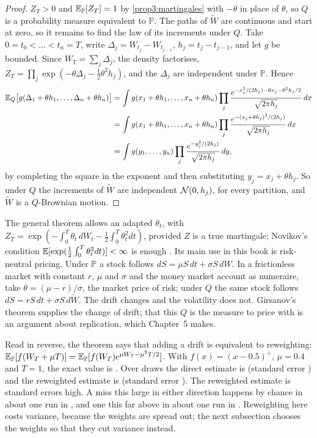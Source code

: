 \begin{chapterrefs}
\begin{proof}
$Z_T>0$ and $\mathbb{E}_{\mathbb P}[Z_T]=1$ by \cref{prop3:martingales} with $-\theta$ in place of $\theta$, so $Q$ is a
probability measure equivalent to $\mathbb P$. The paths of $\tilde W$ are continuous and start at zero, so it
remains to find the law of its increments under $Q$. Take $0=t_0<\dots<t_n=T$, write
$\Delta_j=W_{t_j}-W_{t_{j-1}}$, $h_j=t_j-t_{j-1}$, and let $g$ be bounded. Since $W_T=\sum_j\Delta_j$,
the density factorises, $Z_T=\prod_j\exp(-\theta\Delta_j-\tfrac12\theta^2h_j)$, and the $\Delta_j$ are
independent under $\mathbb P$. Hence
\begin{align*}
  \mathbb{E}_Q\bigl[g(\Delta_1+\theta h_1,\dots,\Delta_n+\theta h_n)\bigr]
  &= \int g(x_1+\theta h_1,\dots,x_n+\theta h_n)\prod_j\frac{e^{-x_j^2/(2h_j)-\theta x_j-\theta^2h_j/2}}{\sqrt{2\pi h_j}}\,dx\\
  &= \int g(x_1+\theta h_1,\dots,x_n+\theta h_n)\prod_j\frac{e^{-(x_j+\theta h_j)^2/(2h_j)}}{\sqrt{2\pi h_j}}\,dx\\
  &= \int g(y_1,\dots,y_n)\prod_j\frac{e^{-y_j^2/(2h_j)}}{\sqrt{2\pi h_j}}\,dy ,
\end{align*}
by completing the square in the exponent and then substituting $y_j=x_j+\theta h_j$. So under $Q$ the
increments of $\tilde W$ are independent $\mathcal{N}(0,h_j)$, for every partition, and $\tilde W$ is a
$Q$-Brownian motion.
\end{proof}

The general theorem allows an adapted $\theta_t$, with
$Z_T=\exp(-\int_0^T\theta_t\,dW_t-\tfrac12\int_0^T\theta_t^2dt)$, provided $Z$ is a true martingale; Novikov's
condition $\mathbb{E}[\exp(\tfrac12\int_0^T\theta_t^2dt)]<\infty$ is enough \parencite{girsanov1960,karatzas1998}.
Its main use in this book is risk-neutral pricing. Under $\mathbb P$ a stock follows
$dS=\mu S\,dt+\sigma S\,dW$. In a frictionless market with constant $r$, $\mu$ and $\sigma$ and the money
market account as numeraire, take $\theta=(\mu-r)/\sigma$, the market price of risk; under $Q$ the same
stock follows $dS=rS\,dt+\sigma S\,d\tilde W$. The drift changes and the volatility does not. Girsanov's
theorem supplies the change of drift; that this $Q$ is the measure to price with is an argument about
replication, which Chapter~5 makes.

Read in reverse, the theorem says that adding a drift is equivalent to reweighting:
$\mathbb{E}_{\mathbb P}[f(W_T+\mu T)]=\mathbb{E}_{\mathbb P}[f(W_T)e^{\mu W_T-\mu^2T/2}]$. With $f(x)=(x-0.5)^+$, $\mu=0.4$ and $T=1$, the exact
value is \girExact. Over \girPaths{} draws the direct estimate is \girDirect{} (standard error
\girDirectSE) and the reweighted estimate is \girWeighted{} (standard error \girWeightedSE).
The reweighted estimate is \girWeightedZ{} standard errors high. A miss this large in either direction
happens by chance in about one run in \girWeightedOdds, and one this far above in about one run in
\girWeightedOddsOne. Reweighting here costs variance, because the weights are spread out; the next subsection chooses the
weights so that they cut variance instead.


\end{chapterrefs}

